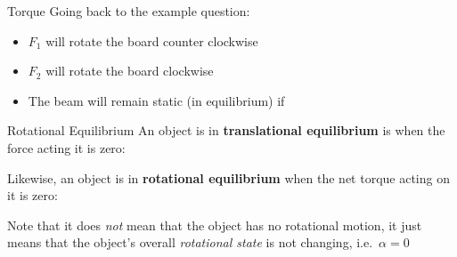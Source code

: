 \documentclass[12pt,compress,aspectratio=169]{beamer}
\newcommand{\mb}[1]{\ensuremath\mathbf{#1}}
\newcommand{\eq}[2]{\vspace{#1}{\Large\begin{displaymath}#2\end{displaymath}}}
\begin{document}
\begin{frame}{Torque}
  Going back to the example question:
  \begin{center}
  \end{center}
  \begin{itemize}
  \item<2->$F_1$ will rotate the board counter clockwise
  \item<3->$F_2$ will rotate the board clockwise
  \item<4->The beam will remain static (in equilibrium) if

    \eq{-.2in}{ F_1d_1=F_2d_2 }
  \end{itemize}
\end{frame}



\begin{frame}{Rotational Equilibrium}
  An object is in \textbf{translational equilibrium} is when the force acting
  it is zero:
  
  \eq{-.2in}{
    \mb{F}=\mb{0}
  }

  Likewise, an object is in \textbf{rotational equilibrium} when the net torque
  acting on it is zero:

  \eq{-.3in}{
    \bm{\tau}=\mb{0}
  }

  Note that it does \emph{not} mean that the object has no rotational motion,
  it just means that the object's overall \emph{rotational state} is not
  changing, i.e.\ $\alpha=0$
\end{frame}
\end{document}
